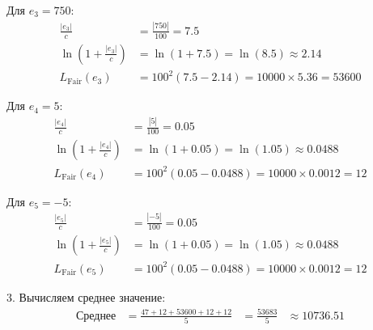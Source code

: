 Для $e_3 = 750$:
\[
    \begin{aligned}
        \frac{|e_3|}{c}                     & = \frac{|750|}{100} = 7.5                       \\
        \ln\left(1 + \frac{|e_3|}{c}\right) & = \ln(1 + 7.5) = \ln(8.5) \approx 2.14          \\
        L_{\text{Fair}}(e_3)                & = 100^2(7.5 - 2.14) = 10000 \times 5.36 = 53600
    \end{aligned}
\]

Для $e_4 = 5$:
\[
    \begin{aligned}
        \frac{|e_4|}{c}                     & = \frac{|5|}{100} = 0.05                          \\
        \ln\left(1 + \frac{|e_4|}{c}\right) & = \ln(1 + 0.05) = \ln(1.05) \approx 0.0488        \\
        L_{\text{Fair}}(e_4)                & = 100^2(0.05 - 0.0488) = 10000 \times 0.0012 = 12
    \end{aligned}
\]

Для $e_5 = -5$:
\[
    \begin{aligned}
        \frac{|e_5|}{c}                     & = \frac{|-5|}{100} = 0.05                         \\
        \ln\left(1 + \frac{|e_5|}{c}\right) & = \ln(1 + 0.05) = \ln(1.05) \approx 0.0488        \\
        L_{\text{Fair}}(e_5)                & = 100^2(0.05 - 0.0488) = 10000 \times 0.0012 = 12
    \end{aligned}
\]

3. Вычисляем среднее значение:
\[
    \begin{aligned}
        \text{Среднее} & = \frac{47 + 12 + 53600 + 12 + 12}{5} & = \frac{53683}{5} & \approx 10736.51
    \end{aligned}
\]
